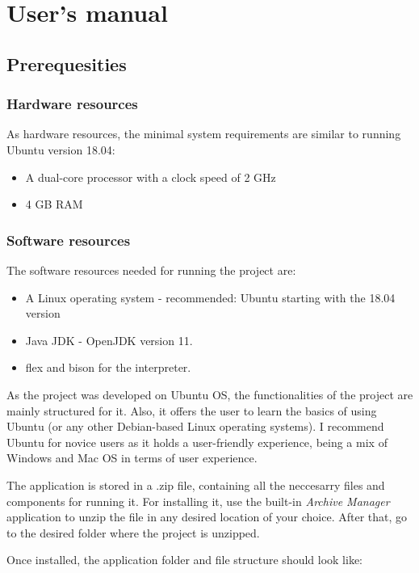 \documentclass[12pt,a4paper,twoside]{report}
\begin{document}
\chapter{User's manual}

\section{Prerequesities}

\subsection{Hardware resources}

As hardware resources, the minimal system requirements are similar to running Ubuntu version 18.04:
\begin{itemize}
\item A dual-core processor with a clock speed of 2 GHz
\item 4 GB RAM
\end{itemize}

\subsection{Software resources}

The software resources needed for running the project are:
\begin{itemize}
	\item A Linux operating system - recommended: Ubuntu starting with the 18.04 version
	\item Java JDK - OpenJDK version 11. 
	\item flex and bison for the interpreter.
\end{itemize}

As the project was developed on Ubuntu OS, the functionalities of the project are mainly structured for it. Also, it offers the user to learn the basics of using Ubuntu (or any other Debian-based Linux operating systems). I recommend Ubuntu for novice users as it holds a user-friendly experience, being a mix of Windows and Mac OS in terms of user experience.

The application is stored in a .zip file, containing all the neccesarry files and components for running it. For installing it, use the built-in \textit{Archive Manager} application to unzip the file in any desired location of your choice. After that, go to the desired folder where the project is unzipped.

Once installed, the application folder and file structure should look like: 
\end{document}
